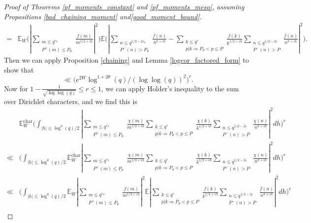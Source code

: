 \documentclass[10pt,a4paper]{amsart}
\numberwithin{equation}{section}
\begin{document}
\begin{proof}[Proof of Theorems \ref{pf_moments_constant} and \ref{pf_moments_meso}, assuming Propositions \ref{bad_chaining_moment} and\ref{good_moment_bound}]
\begin{equation*}
\begin{split}
        =& \mathbb{E}_W\big(|\sum_{\substack{m \leq q^{\varepsilon_\theta} \\ P^+(m) \leq P_\theta}}\frac{f(m)}{m^{1/2+ih}}|^2\big)\mathbb{E}\big(|\sum_{\substack{n \leq q^{1/2-2\varepsilon_\theta} \\ P^{-}(n) >P_\theta}}\frac{f(n)}{n^{\sigma+ih}}-\sum_{\substack{k \leq q^{\varepsilon} \\ p|k \Rightarrow P_\theta < p \leq P}}\frac{f(k)}{k^{1/2+ih}}\sum_{\substack{n \leq q^{1/2-2\varepsilon} \\ P^{-}(n) > P}}\frac{f(n)}{n^{\sigma+ih}}|^2\big).
    \end{split}     
    \end{equation*}
    Then we can apply Proposition \ref{chaining} and Lemma \ref{logcor_factored_form} to show that
    $$\ll \big(e^{2W}\log^{1+2\theta}(q)/(\log\log(q))^2\big)^r.$$
    Now for $1-\frac{1}{\sqrt{\log\log(q)}} \leq r \leq 1$, we can apply Holder's inequality to the sum over Dirichlet characters, and we find this is
    \begin{align*}
        &\mathbb{E}_W^{\text{char}}\big(\int_{|h| \leq \log^\theta(q)/2}|\sum_{\substack{m \leq q^{\varepsilon_\theta} \\ P^+(m) \leq P_\theta}}\frac{\chi(m)}{m^{1/2+ih}}\sum_{\substack{k \leq q^{\varepsilon} \\ p|k \Rightarrow P_\theta < p \leq P}}\frac{\chi(k)}{k^{1/2+ih}}\sum_{\substack{n \leq q^{1/2-2\varepsilon} \\ P^{-}(n) > P}}\frac{\chi(n)}{n^{\sigma+ih}}|^2dh\big)^r \\
        \ll&\big(\int_{|h| \leq \log^\theta(q)/2}\mathbb{E}_W^{\text{char}}|\sum_{\substack{m \leq q^{\varepsilon_\theta} \\ P^+(m) \leq P_\theta}}\frac{\chi(m)}{m^{1/2+ih}}\sum_{\substack{k \leq q^{\varepsilon} \\ p|k \Rightarrow P_\theta < p \leq P}}\frac{\chi(k)}{k^{1/2+ih}}\sum_{\substack{n \leq q^{1/2-2\varepsilon} \\ P^{-}(n) > P}}\frac{\chi(n)}{n^{\sigma+ih}}|^2dh\big)^r \\
        \ll& \big(\int_{|h| \leq \log^\theta(q)/2}\mathbb{E}_W|\sum_{\substack{m \leq q^{\varepsilon_\theta} \\ P^+(m) \leq P_\theta}}\frac{f(m)}{m^{1/2+ih}}|^2\mathbb{E}|\sum_{\substack{k \leq q^{\varepsilon} \\ p|k \Rightarrow P_\theta < p \leq P}}\frac{f(k)}{k^{1/2+ih}}\sum_{\substack{n \leq q^{1/2-2\varepsilon} \\ P^{-}(n) > P}}\frac{f(n)}{n^{\sigma+ih}}|^2dh\big)^r \\

\end{align*}
\end{proof}
\end{document}
